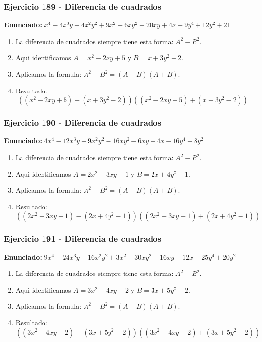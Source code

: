 \documentclass[11pt,a4paper]{article}
\begin{document}
\subsubsection*{Ejercicio 189 - Diferencia de cuadrados}
\textbf{Enunciado:} $ x^{4} - 4 x^{3} y + 4 x^{2} y^{2} + 9 x^{2} - 6 x y^{2} - 20 x y + 4 x - 9 y^{4} + 12 y^{2} + 21 $\par
\begin{enumerate}[leftmargin=2em]
\item La diferencia de cuadrados siempre tiene esta forma: \(A^2-B^2\).
\item Aqui identificamos \(A=x^{2} - 2 x y + 5\) y \(B=x + 3 y^{2} - 2\).
\item Aplicamos la formula: \(A^2-B^2=(A-B)(A+B)\).
\item Resultado: \[\boxed{\left(\left(x^{2} - 2 x y + 5\right)-\left(x + 3 y^{2} - 2\right)\right)\left(\left(x^{2} - 2 x y + 5\right)+\left(x + 3 y^{2} - 2\right)\right)}\]
\end{enumerate}

\vspace{0.2cm}
\subsubsection*{Ejercicio 190 - Diferencia de cuadrados}
\textbf{Enunciado:} $ 4 x^{4} - 12 x^{3} y + 9 x^{2} y^{2} - 16 x y^{2} - 6 x y + 4 x - 16 y^{4} + 8 y^{2} $\par
\begin{enumerate}[leftmargin=2em]
\item La diferencia de cuadrados siempre tiene esta forma: \(A^2-B^2\).
\item Aqui identificamos \(A=2 x^{2} - 3 x y + 1\) y \(B=2 x + 4 y^{2} - 1\).
\item Aplicamos la formula: \(A^2-B^2=(A-B)(A+B)\).
\item Resultado: \[\boxed{\left(\left(2 x^{2} - 3 x y + 1\right)-\left(2 x + 4 y^{2} - 1\right)\right)\left(\left(2 x^{2} - 3 x y + 1\right)+\left(2 x + 4 y^{2} - 1\right)\right)}\]
\end{enumerate}

\vspace{0.2cm}
\subsubsection*{Ejercicio 191 - Diferencia de cuadrados}
\textbf{Enunciado:} $ 9 x^{4} - 24 x^{3} y + 16 x^{2} y^{2} + 3 x^{2} - 30 x y^{2} - 16 x y + 12 x - 25 y^{4} + 20 y^{2} $\par
\begin{enumerate}[leftmargin=2em]
\item La diferencia de cuadrados siempre tiene esta forma: \(A^2-B^2\).
\item Aqui identificamos \(A=3 x^{2} - 4 x y + 2\) y \(B=3 x + 5 y^{2} - 2\).
\item Aplicamos la formula: \(A^2-B^2=(A-B)(A+B)\).
\item Resultado: \[\boxed{\left(\left(3 x^{2} - 4 x y + 2\right)-\left(3 x + 5 y^{2} - 2\right)\right)\left(\left(3 x^{2} - 4 x y + 2\right)+\left(3 x + 5 y^{2} - 2\right)\right)}\]
\end{enumerate}
\end{document}
